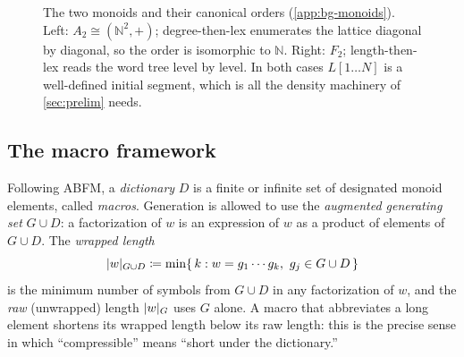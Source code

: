 \documentclass[11pt]{article}
\numberwithin{equation}{section}
\newcommand{\N}{\mathbb{N}}
\newcommand{\defeq}{\coloneqq}
\DeclarePairedDelimiter{\abs}{\lvert}{\rvert}
\DeclarePairedDelimiter{\set}{\{}{\}}
\newcommand{\rest}[2]{#1[1\!\dots\! #2]}
\theoremstyle{plain}
\theoremstyle{definition}
\theoremstyle{remark}
\begin{document}
\begin{figure}[t]

\caption{The two monoids and their canonical orders (\cref{app:bg-monoids}). Left:
$A_2 \cong (\N^2,+)$; degree-then-lex enumerates the lattice diagonal by diagonal,
so the order is isomorphic to $\N$. Right: $F_2$; length-then-lex reads the word
tree level by level. In both cases $\rest{L}{N}$ is a well-defined initial segment,
which is all the density machinery of \cref{sec:prelim} needs.}
\label{fig:monoids}
\end{figure}

\subsection{The macro framework}
\label{app:bg-macros}

Following ABFM, a \emph{dictionary} $D$ is a finite or infinite set of designated monoid
elements, called \emph{macros}. Generation is allowed to use the \emph{augmented generating
set} $G \cup D$: a factorization of $w$ is an expression of $w$ as a product of elements of $G
\cup D$. The \emph{wrapped length}
\begin{equation}\label{eq:wraplen}
  \abs{w}_{G \cup D} \defeq \min \set*{\, k : w = g_1 \cdots g_k,\ g_j \in G \cup D \,}
\end{equation}
is the minimum number of symbols from $G \cup D$ in any factorization of $w$, and the
\emph{raw} (unwrapped) length $\abs{w}_G$ uses $G$ alone. A macro that abbreviates a long
element shortens its wrapped length below its raw length: this is the precise sense in which
``compressible'' means ``short under the dictionary.''
\end{document}
